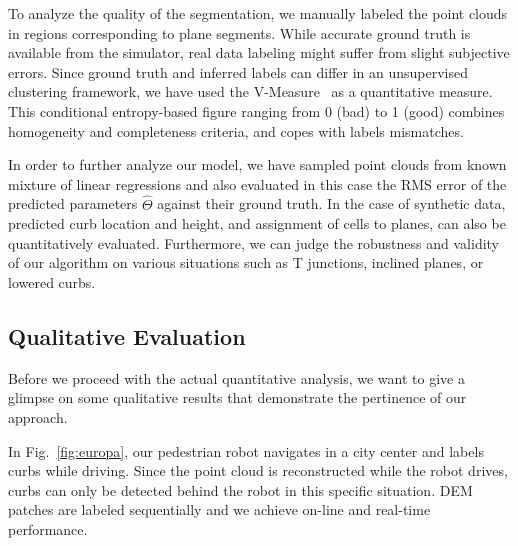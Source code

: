 

To analyze the quality of the segmentation, we manually labeled the point clouds
in regions corresponding to plane segments. While accurate ground truth is
available from the simulator, real data labeling might suffer from slight
subjective errors. Since ground truth and inferred labels can differ in an
unsupervised clustering framework, we have used the
V-Measure~\cite{rosenberg07vmeasure} as a quantitative measure. This conditional
entropy-based figure ranging from 0 (bad) to 1 (good) combines homogeneity and
completeness criteria, and copes with labels mismatches.

In order to further analyze our model, we have sampled point clouds from known
mixture of linear regressions and also evaluated in this case the RMS
error of the predicted parameters $\hat{\Theta}$ against their ground truth. In
the case of synthetic data, predicted curb location and height, and assignment
of cells to planes, can also be quantitatively evaluated. Furthermore, we can
judge the robustness and validity of our algorithm on various situations such
as T junctions, inclined planes, or lowered curbs.

\subsection{Qualitative Evaluation}
Before we proceed with the actual quantitative analysis, we want to give a
glimpse on some qualitative results that demonstrate the pertinence of our
approach.

In Fig.~\ref{fig:europa}, our pedestrian robot navigates in a city center and
labels curbs while driving. Since the point cloud is reconstructed while the
robot drives, curbs can only be detected behind the robot in this specific
situation. DEM patches are labeled sequentially and we achieve on-line and
real-time performance.

